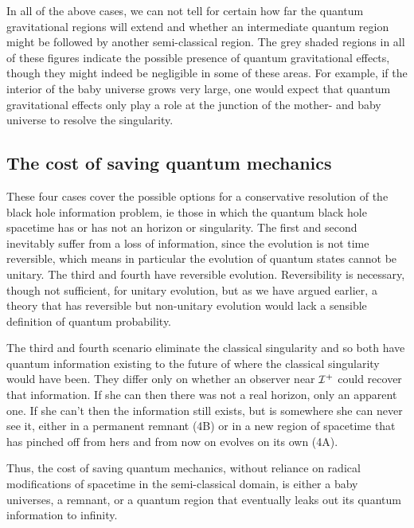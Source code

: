 \documentclass[12pt]{article}
\begin{document}
In all of the above cases, we can not tell for certain how far the quantum gravitational regions will extend and
whether an intermediate quantum region might be followed by another semi-classical region. The grey shaded regions in all of these
figures indicate the possible presence of quantum gravitational effects, though they might indeed
be negligible in some of these areas. For example, if the interior of the baby universe grows very large, one would
expect that quantum gravitational effects only play a role at the junction of the mother- and baby universe to resolve the singularity.




\subsection*{The cost of saving quantum mechanics}

These four cases cover the possible options for a conservative resolution of the black hole information problem, ie those  in which the quantum black hole spacetime has or has not an horizon or singularity.
The first and second inevitably suffer from a loss of information, since the evolution is not time reversible, which means in particular the evolution of quantum states cannot be unitary. The third and fourth have reversible evolution. Reversibility is necessary, though not sufficient, for unitary evolution, but as we have argued earlier, a theory that has reversible but non-unitary evolution would lack a sensible definition of quantum probability.  

The  third and fourth scenario eliminate the classical singularity and so both have quantum information existing to the future of where the classical singularity would have been.  They differ only on whether an observer near ${\cal I}^+$ could recover that information.  If she can then there was not a real horizon, only an apparent one.  If she can't then the information still exists, but is somewhere she can never see it, either in a permanent remnant (4B) or in a new region of spacetime that has pinched off from hers and from now on evolves on its own (4A).  

Thus, the cost of saving quantum mechanics, without reliance on radical modifications of spacetime in the semi-classical domain, 
is either a baby universes, a remnant, or a quantum region 
that eventually leaks out its quantum information to infinity.  
\end{document}
